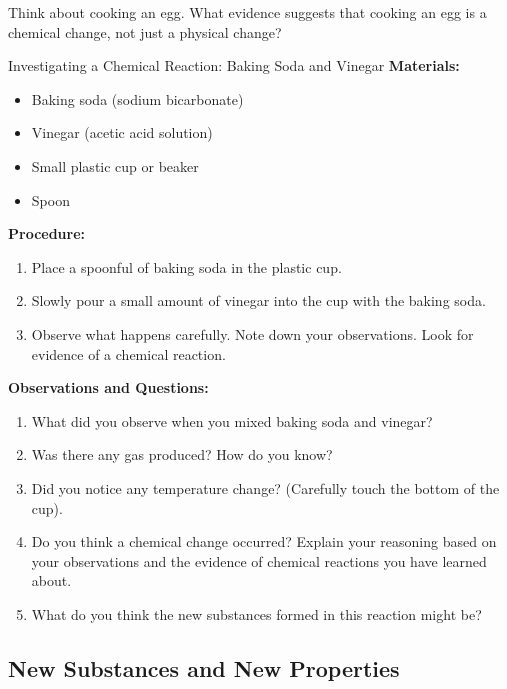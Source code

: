 \begin{stopandthink}
Think about cooking an egg. What evidence suggests that cooking an egg is a chemical change, not just a physical change?
\end{stopandthink}

\begin{investigation}{Investigating a Chemical Reaction: Baking Soda and Vinegar}
\textbf{Materials:}
\begin{itemize}
    \item Baking soda (sodium bicarbonate)
    \item Vinegar (acetic acid solution)
    \item Small plastic cup or beaker
    \item Spoon
\end{itemize}

\textbf{Procedure:}
\begin{enumerate}
    \item Place a spoonful of baking soda in the plastic cup.
    \item Slowly pour a small amount of vinegar into the cup with the baking soda.
    \item Observe what happens carefully. Note down your observations. Look for evidence of a chemical reaction.
\end{enumerate}

\textbf{Observations and Questions:}
\begin{enumerate}
    \item What did you observe when you mixed baking soda and vinegar?
    \item Was there any gas produced? How do you know?
    \item Did you notice any temperature change? (Carefully touch the bottom of the cup).
    \item Do you think a chemical change occurred? Explain your reasoning based on your observations and the evidence of chemical reactions you have learned about.
    \item What do you think the new substances formed in this reaction might be? 
\end{enumerate}
\end{investigation}


\subsection{New Substances and New Properties}


